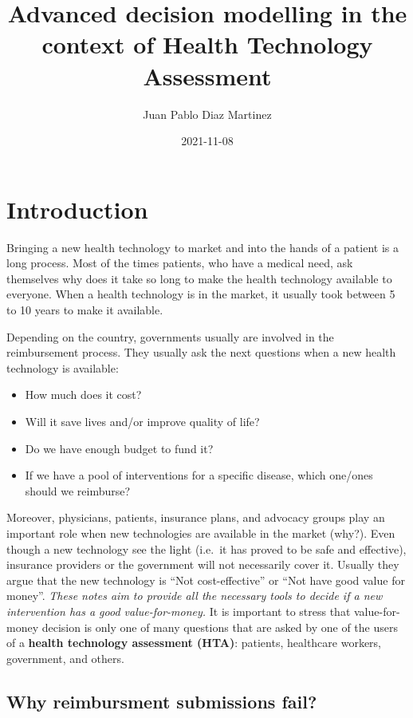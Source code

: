 \documentclass[
]{book}
\title{Advanced decision modelling in the context of Health Technology Assessment}
\author{Juan Pablo Diaz Martinez}
\date{2021-11-08}
\providecommand{\tightlist}{%
  \setlength{\itemsep}{0pt}\setlength{\parskip}{0pt}}
\begin{document}
\maketitle

{
\setcounter{tocdepth}{1}
\tableofcontents
}
\hypertarget{introduction}{%
\chapter*{Introduction}\label{introduction}}

Bringing a new health technology to market and into the hands of a patient is a long process. Most of the times patients, who have a medical need, ask themselves why does it take so long to make the health technology available to everyone. When a health technology is in the market, it usually took between 5 to 10 years to make
it available.

Depending on the country, governments usually are involved in the reimbursement process. They usually ask the next questions when a new health technology is available:

\begin{itemize}
\tightlist
\item
  How much does it cost?
\item
  Will it save lives and/or improve quality of life?
\item
  Do we have enough budget to fund it?
\item
  If we have a pool of interventions for a specific disease, which one/ones should we reimburse?
\end{itemize}

Moreover, physicians, patients, insurance plans, and advocacy groups play an important role when new technologies are available in the market (why?). Even though a new technology see the light (i.e.~it has proved to be safe and effective), insurance providers or the government will not necessarily cover it. Usually they argue that the new technology is ``Not cost-effective'' or ``Not have good value for money''. \emph{These notes aim to provide all the necessary tools to decide if a new intervention has a good value-for-money.} It is important to stress that value-for-money decision is only one of many questions that are asked by one of the users of a \textbf{health technology assessment (HTA)}: patients, healthcare workers, government, and others.

\hypertarget{why-reimbursment-submissions-fail}{%
\section*{Why reimbursment submissions fail?}\label{why-reimbursment-submissions-fail}}
\end{document}
